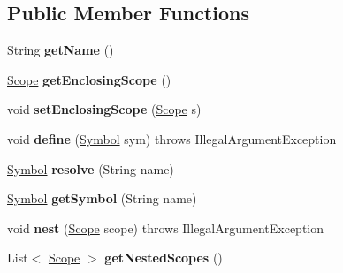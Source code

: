 \subsection*{Public Member Functions}
\begin{DoxyCompactItemize}
\item 
\mbox{\label{interfacelime_1_1antlr4_1_1Scope_aef43f9cd973a1a31c005c8fe44db65a0}} 
String {\bfseries get\+Name} ()
\item 
\mbox{\label{interfacelime_1_1antlr4_1_1Scope_a7fb3b80a70c0c0828bbd5539851207b9}} 
\hyperlink{interfacelime_1_1antlr4_1_1Scope}{Scope} {\bfseries get\+Enclosing\+Scope} ()
\item 
\mbox{\label{interfacelime_1_1antlr4_1_1Scope_a55166ac3b34d96eb8880a99e6a6b103e}} 
void {\bfseries set\+Enclosing\+Scope} (\hyperlink{interfacelime_1_1antlr4_1_1Scope}{Scope} s)
\item 
\mbox{\label{interfacelime_1_1antlr4_1_1Scope_ae00121132c58b59c9068ce8fdbfda038}} 
void {\bfseries define} (\hyperlink{interfacelime_1_1antlr4_1_1Symbol}{Symbol} sym)  throws Illegal\+Argument\+Exception
\item 
\mbox{\label{interfacelime_1_1antlr4_1_1Scope_a2e47a3f05a1ebee278deef9b04ee5329}} 
\hyperlink{interfacelime_1_1antlr4_1_1Symbol}{Symbol} {\bfseries resolve} (String name)
\item 
\mbox{\label{interfacelime_1_1antlr4_1_1Scope_ae5aee3e1d939631a9c3ea7dcd02410cb}} 
\hyperlink{interfacelime_1_1antlr4_1_1Symbol}{Symbol} {\bfseries get\+Symbol} (String name)
\item 
\mbox{\label{interfacelime_1_1antlr4_1_1Scope_a2db507561bb359243c05663b7eb43c3f}} 
void {\bfseries nest} (\hyperlink{interfacelime_1_1antlr4_1_1Scope}{Scope} scope)  throws Illegal\+Argument\+Exception
\item 
\mbox{\label{interfacelime_1_1antlr4_1_1Scope_a9a20c558459e662c9f9c112b58d6db47}} 
List$<$ \hyperlink{interfacelime_1_1antlr4_1_1Scope}{Scope} $>$ {\bfseries get\+Nested\+Scopes} ()

\end{DoxyCompactItemize}
